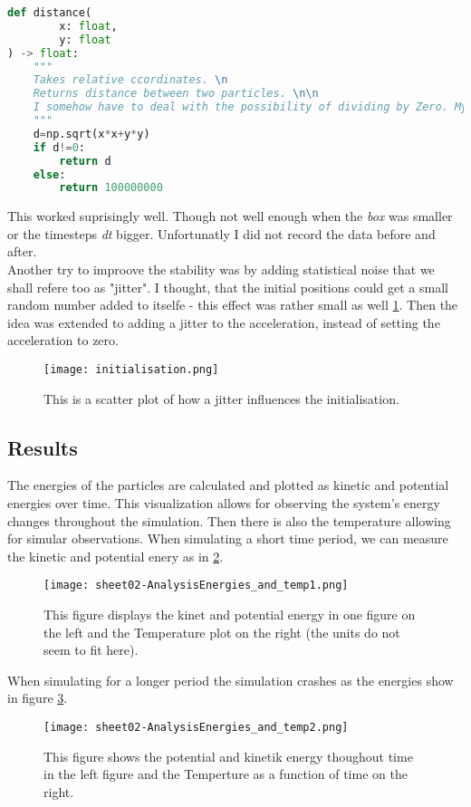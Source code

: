 \documentclass{article}
\begin{document}
\begin{lstlisting}[language=Python, caption=Countering "devide by zero" errors.]
def distance(
        x: float,
        y: float
) -> float:
    """
    Takes relative ccordinates. \n
    Returns distance between two particles. \n\n
    I somehow have to deal with the possibility of dividing by Zero. My idea is to set distance very large, so that the collision get "ignored".
    """
    d=np.sqrt(x*x+y*y)
    if d!=0:
        return d 
    else:
        return 100000000
\end{lstlisting}
This worked suprisingly well. Though not well enough when the \textit{box} was smaller or the timesteps \textit{dt} bigger. Unfortunatly I did not record the data before and after.\\
Another try to improove the stability was by adding statistical noise that we shall refere too as "jitter". I thought, that the initial positions could get a small random number added to itselfe - this effect was rather small as well \ref{initjitter_scatter}. Then the idea was extended to adding a jitter to the acceleration, instead of setting the acceleration to zero.

\begin{figure}[ht]
    \centering
    \texttt{[image: initialisation.png]}
    \caption{This is a scatter plot of how a jitter influences the initialisation.}\label{initjitter_scatter}
\end{figure}

\newpage
\subsection{Results}
The energies of the particles are calculated and plotted as kinetic and potential energies over time. This visualization allows for observing the system’s energy changes throughout the simulation. Then there is also the temperature allowing for simular observations.
When simulating a short time period, we can measure the kinetic and potential enery as in \ref{fig:kinandpot}.
\begin{figure}[ht]
    \centering
    \texttt{[image: sheet02-AnalysisEnergies\_and\_temp1.png]}
    \caption{This figure displays the kinet and potential energy in one figure on the left and the Temperature plot on the right (the units do not seem to fit here). }
    \label{fig:kinandpot}
\end{figure}
When simulating for a longer period the simulation crashes as the energies show in figure \ref{fig:simcrash}.
\begin{figure}[ht]
    \centering
    \texttt{[image: sheet02-AnalysisEnergies\_and\_temp2.png]} 
    \caption{This figure shows the potential and kinetik energy thoughout time in the left figure and the Temperture as a function of time on the right.}
    \label{fig:simcrash}
\end{figure}
\end{document}
